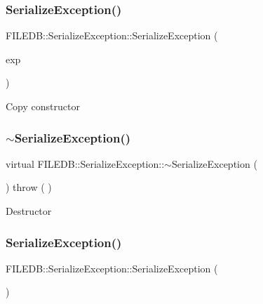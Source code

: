 \subsubsection{\texorpdfstring{SerializeException()}{SerializeException()}\hspace{0.1cm}{\footnotesize\ttfamily [5/6]}}
{\footnotesize\ttfamily F\+I\+L\+E\+D\+B\+::\+Serialize\+Exception\+::\+Serialize\+Exception (\begin{DoxyParamCaption}\item[{const \mbox{\hyperlink{classFILEDB_1_1SerializeException}{Serialize\+Exception}} \&}]{exp }\end{DoxyParamCaption})}

Copy constructor \mbox{\label{classFILEDB_1_1SerializeException_ace236a2abdc486c44c695fbdc209923a}} 
\subsubsection{\texorpdfstring{$\sim$SerializeException()}{~SerializeException()}\hspace{0.1cm}{\footnotesize\ttfamily [2/2]}}
{\footnotesize\ttfamily virtual F\+I\+L\+E\+D\+B\+::\+Serialize\+Exception\+::$\sim$\+Serialize\+Exception (\begin{DoxyParamCaption}\item[{void}]{ }\end{DoxyParamCaption}) throw ( ) \hspace{0.3cm}{\ttfamily [virtual]}}

Destructor \mbox{\label{classFILEDB_1_1SerializeException_a84b139cba956139f16f27094d53fd68a}} 
\subsubsection{\texorpdfstring{SerializeException()}{SerializeException()}\hspace{0.1cm}{\footnotesize\ttfamily [6/6]}}
{\footnotesize\ttfamily F\+I\+L\+E\+D\+B\+::\+Serialize\+Exception\+::\+Serialize\+Exception (\begin{DoxyParamCaption}\item[{void}]{ }\end{DoxyParamCaption})\hspace{0.3cm}{\ttfamily [protected]}}



